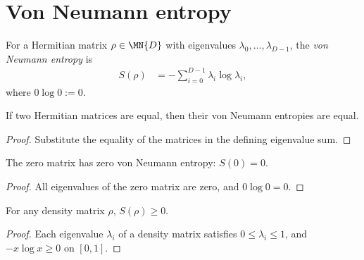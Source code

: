 \section{Von Neumann entropy}

\begin{definition}\label{def:von_neumann_entropy}
    \leanok
    For a Hermitian matrix $\rho\in\MN{D}$ with eigenvalues
    $\lambda_0,\ldots,\lambda_{D-1}$, the \emph{von Neumann entropy} is
    \begin{align}
        S(\rho)
         & =-\sum_{i=0}^{D-1}\lambda_i\log\lambda_i,
        \label{eq:entropy_definition}
    \end{align}
    where $0\log 0:=0$.
\end{definition}

\begin{lemma}\label{lem:entropy_congr}
    \leanok
    If two Hermitian matrices are equal, then their von Neumann entropies are
    equal.
\end{lemma}

\begin{proof}\leanok
    Substitute the equality of the matrices in the defining eigenvalue sum.
\end{proof}

\begin{lemma}\label{lem:entropy_zero}
    \leanok
    The zero matrix has zero von Neumann entropy: $S(0)=0$.
\end{lemma}

\begin{proof}\leanok
    All eigenvalues of the zero matrix are zero, and $0\log 0=0$.
\end{proof}

\begin{theorem}\label{thm:entropy_nonneg}
    \leanok
    For any density matrix $\rho$, $S(\rho)\ge0$.
\end{theorem}

\begin{proof}\leanok
    Each eigenvalue $\lambda_i$ of a density matrix satisfies
    $0\le\lambda_i\le1$, and $-x\log x\ge0$ on $[0,1]$.
\end{proof}

